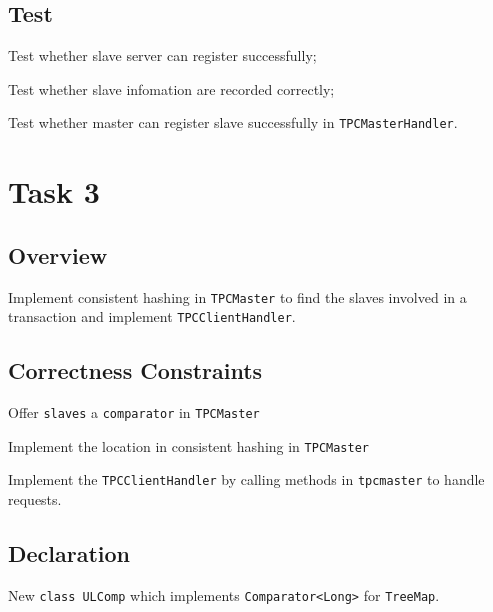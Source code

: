 \documentclass{article}
\begin{document}
\subsection{Test}
\begin{compactitem}
	\item Test whether slave server can register successfully;
	\item Test whether slave infomation are recorded correctly;
	\item Test whether master can register slave successfully in \texttt{TPCMasterHandler}.
\end{compactitem}

\section{Task 3}
\subsection{Overview}
Implement consistent hashing in \texttt{TPCMaster} to find the slaves involved in a transaction and implement \texttt{TPCClientHandler}.
\subsection{Correctness Constraints}
\begin{compactitem}
	\item Offer \texttt{slaves} a \texttt{comparator} in \texttt{TPCMaster}
	\item Implement the location in consistent hashing in \texttt{TPCMaster}
	\item Implement the \texttt{TPCClientHandler} by calling methods in \texttt{tpcmaster} to handle requests.
\end{compactitem}
\subsection{Declaration}
\begin{compactitem}
	\item New \texttt{class ULComp} which implements \texttt{Comparator<Long>} for \texttt{TreeMap}.
\end{compactitem}
\end{document}
